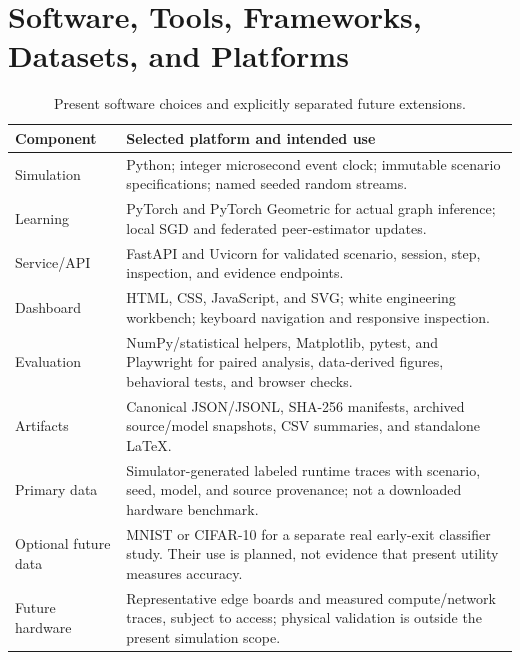 \documentclass[11pt,a4paper]{article}
\begin{document}
\section{Software, Tools, Frameworks, Datasets, and Platforms}
\begin{table}[htbp]
\centering\small
\begin{tabularx}{\textwidth}{L{3.2cm}X}
\toprule Component & Selected platform and intended use\\\midrule
Simulation & Python; integer microsecond event clock; immutable scenario specifications; named seeded random streams.\\
Learning & PyTorch and PyTorch Geometric for actual graph inference; local SGD and federated peer-estimator updates.\\
Service/API & FastAPI and Uvicorn for validated scenario, session, step, inspection, and evidence endpoints.\\
Dashboard & HTML, CSS, JavaScript, and SVG; white engineering workbench; keyboard navigation and responsive inspection.\\
Evaluation & NumPy/statistical helpers, Matplotlib, pytest, and Playwright for paired analysis, data-derived figures, behavioral tests, and browser checks.\\
Artifacts & Canonical JSON/JSONL, SHA-256 manifests, archived source/model snapshots, CSV summaries, and standalone LaTeX.\\
Primary data & Simulator-generated labeled runtime traces with scenario, seed, model, and source provenance; not a downloaded hardware benchmark.\\
Optional future data & MNIST or CIFAR-10 for a separate real early-exit classifier study. Their use is planned, not evidence that present utility measures accuracy.\\
Future hardware & Representative edge boards and measured compute/network traces, subject to access; physical validation is outside the present simulation scope.\\
\bottomrule
\end{tabularx}
\caption{Present software choices and explicitly separated future extensions.}
\end{table}
\end{document}
